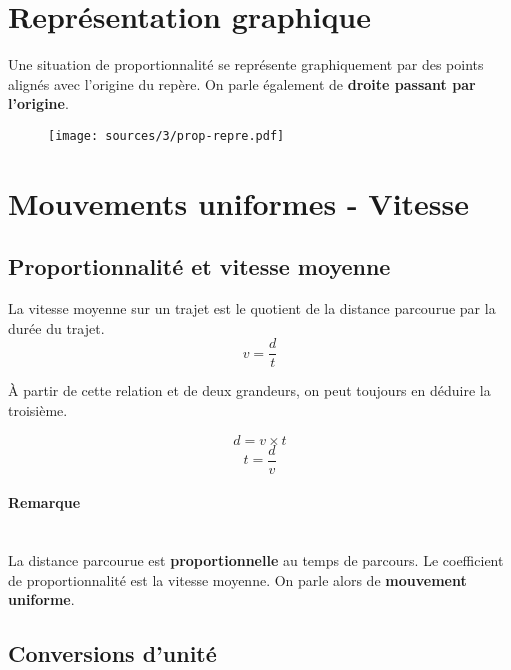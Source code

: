 \documentclass[paper=a4, fontsize=9pt]{scrartcl} %
\begin{document}
\section{Représentation graphique}

\begin{Proposition}
  Une situation de proportionnalité se représente graphiquement par des points alignés avec l'origine du repère. On parle également de \textbf{droite passant par l'origine}.
\end{Proposition}

\begin{figure}[H]
  \centering
  \texttt{[image: sources/3/prop-repre.pdf]}
\end{figure}

\section{Mouvements uniformes - Vitesse}
\subsection{Proportionnalité et vitesse moyenne}

\begin{Definition}
  La vitesse moyenne sur un trajet est le  quotient de la distance parcourue par la durée du trajet.
  $$v = \frac{d}{t}$$
\end{Definition}

\begin{Proposition}
  À partir de cette relation et de deux grandeurs, on peut toujours en déduire la troisième.
  \begin{multicols}{2}
    $$d = v \times t$$
    $$t = \frac{d}{v}$$
  \end{multicols}
\end{Proposition}

\paragraph{Remarque}~~\\
La distance parcourue est \textbf{proportionnelle} au temps de parcours. Le coefficient de proportionnalité est la vitesse moyenne. On parle alors de \textbf{mouvement uniforme}.

\subsection{Conversions d'unité}
\end{document}
